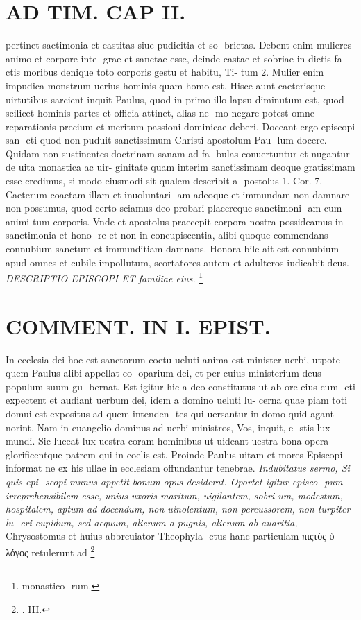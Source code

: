 \documentclass{article}
\begin{document}
\begin{pages}
\section*{AD TIM. CAP II. }
\marginpar{[ p.122 ]}\pstart pertinet sactimonia et castitas siue pudicitia et so- brietas. Debent enim mulieres animo et corpore inte- grae et sanctae esse, deinde castae et sobriae in dictis fa- ctis moribus denique toto corporis gestu et habitu, Ti- tum 2. Mulier enim impudica monstrum uerius hominis quam homo est. Hisce aunt caeterisque uirtutibus sarcient inquit Paulus, quod in primo illo lapsu diminutum est, quod scilicet hominis partes et officia attinet, alias ne- mo negare potest omne reparationis precium et meritum passioni dominicae deberi. Doceant ergo episcopi san- cti quod non puduit sanctissimum Christi apostolum Pau- lum docere. Quidam non sustinentes doctrinam sanam ad fa- bulas conuertuntur et nugantur de uita monastica ac uir- ginitate quam interim sanctissimam deoque gratissimam esse credimus, si modo eiusmodi sit qualem describit a- postolus 1. Cor. 7. Caeterum coactam illam et inuoluntari- am adeoque et immundam non damnare non possumus, quod certo sciamus deo probari placereque sanctimoni- am cum animi tum corporis. Vnde et apostolus praecepit corpora nostra possideamus in sanctimonia et hono- re et non in concupiscentia, alibi quoque commendans connubium sanctum et immunditiam damnans. Honora bile ait est connubium apud omnes et cubile impollutum, scortatores autem et adulteros iudicabit deus.  \pend
\textit{DESCRIPTIO EPISCOPI ET familiae eius. }\footnote{\footnotesizeCoelibatus monastico- rum. }
\section*{COMMENT. IN I. EPIST. }\pstart In ecclesia dei hoc est sanctorum coetu ueluti anima est minister uerbi, utpote quem Paulus alibi appellat co- oparium dei, et per cuius ministerium deus populum suum gu- bernat. Est igitur hic a deo constitutus ut ab ore eius cum- cti expectent et audiant uerbum dei, idem a domino ueluti lu- cerna quae piam toti domui est expositus ad quem intenden- tes qui uersantur in domo quid agant norint. Nam in euangelio dominus ad uerbi ministros, Vos, inquit, e- stis lux mundi. Sic luceat lux uestra coram hominibus ut uideant uestra bona opera glorificentque patrem qui in coelis est. Proinde Paulus uitam et mores Episcopi informat ne ex his ullae in ecclesiam offundantur tenebrae.  \pend
\textit{Indubitatus sermo, Si quis epi- scopi munus appetit bonum opus desiderat. Oportet igitur episco- pum irreprehensibilem esse, unius uxoris maritum, uigilantem, sobri um, modestum, hospitalem, aptum ad docendum, non uinolentum, non percussorem, non turpiter lu- cri cupidum, sed aequum, alienum a pugnis, alienum ab auaritia, }\pstart Chrysostomus et huius abbreuiator Theophyla- ctus hanc particulam πιςτὸς ὁ λόγος retulerunt ad  \pend\footnote{\footnotesizeCAP. III. }
\end{pages}
\end{document}
